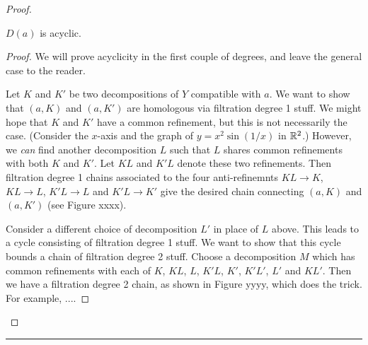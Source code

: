 \begin{proof}
\begin{lemma}
$D(a)$ is acyclic.
\end{lemma}

\begin{proof}
We will prove acyclicity in the first couple of degrees, and 
leave the general case to the reader.

Let $K$ and $K'$ be two decompositions of $Y$ compatible with $a$.
We want to show that $(a, K)$ and $(a, K')$ are homologous via filtration degree 1 stuff.
We might hope that $K$ and $K'$ have a common refinement, but this is not necessarily
the case.
(Consider the $x$-axis and the graph of $y = x^2\sin(1/x)$ in $\mathbb{R}^2$.)
However, we {\it can} find another decomposition $L$ such that $L$ shares common
refinements with both $K$ and $K'$.
Let $KL$ and $K'L$ denote these two refinements.
Then filtration degree 1 chains associated to the four anti-refinemnts
$KL\to K$, $KL\to L$, $K'L\to L$ and $K'L\to K'$
give the desired chain connecting $(a, K)$ and $(a, K')$
(see Figure xxxx).

Consider a different choice of decomposition $L'$ in place of $L$ above.
This leads to a cycle consisting of filtration degree 1 stuff.
We want to show that this cycle bounds a chain of filtration degree 2 stuff.
Choose a decomposition $M$ which has common refinements with each of 
$K$, $KL$, $L$, $K'L$, $K'$, $K'L'$, $L'$ and $KL'$.
Then we have a filtration degree 2 chain, as shown in Figure yyyy, which does the trick.
For example, ....


\end{proof}


\end{proof}





\medskip
\hrule
\medskip

\medskip

